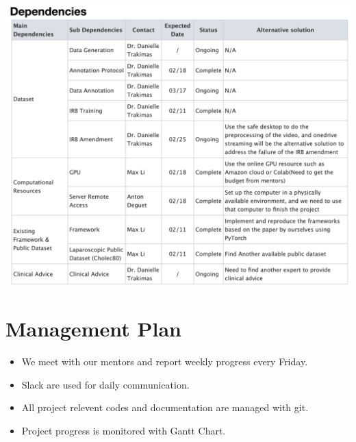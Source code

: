 \documentclass[11pt]{article} \usepackage[top=1in, bottom=1in, left=1in, right=1in]{geometry}
\begin{document}
\includegraphics[width=\textwidth]{dependency.png}

\section{Management Plan}
\begin{itemize}
    \item We meet with our mentors and report weekly progress every Friday.
    \item Slack are used for daily communication.
    \item All project relevent codes and documentation are managed with git.
    \item Project progress is monitored with Gantt Chart. 
\end{itemize}
\nocite{*}


\end{document}
